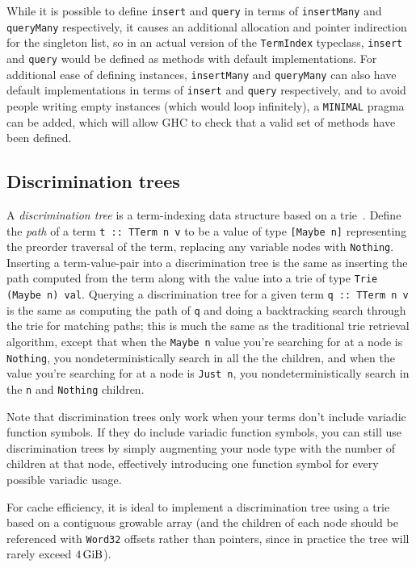 \documentclass[11pt]{report}
\newcommand{\haskell}[1]{\texttt{#1}}
\begin{document}
While it is possible to define \haskell{insert} and \haskell{query} in terms of
\haskell{insertMany} and \haskell{queryMany} respectively, it causes an
additional allocation and pointer indirection for the singleton list, so in an
actual version of the \haskell{TermIndex} typeclass, \haskell{insert} and
\haskell{query} would be defined as methods with default implementations.
For additional ease of defining instances, \haskell{insertMany} and
\haskell{queryMany} can also have default implementations in terms of
\haskell{insert} and \haskell{query} respectively, and to avoid people writing
empty instances (which would loop infinitely), a \texttt{MINIMAL} pragma can be
added, which will allow GHC to check that a valid set of methods have been
defined.

\subsection{Discrimination trees}
\label{sec:discrimination-trees}

A \textit{discrimination tree} is a term-indexing data structure based on a
trie~\cite{handbook-ch26}. Define the \textit{path} of a term
\haskell{t :: TTerm n v} to be a value of type \haskell{[Maybe n]} representing
the preorder traversal of the term, replacing any variable nodes with
\haskell{Nothing}. Inserting a term-value-pair into a discrimination tree is the
same as inserting the path computed from the term along with the value into a
trie of type \haskell{Trie (Maybe n) val}. Querying a discrimination tree for a
given term \haskell{q :: TTerm n v} is the same as computing the path of
\haskell{q} and doing a backtracking search through the trie for matching paths;
this is much the same as the traditional trie retrieval algorithm, except that
when the \haskell{Maybe n} value you're searching for at a node is
\haskell{Nothing}, you nondeterministically search in all the the children, and
when the value you're searching for at a node is \haskell{Just n}, you
nondeterministically search in the \haskell{n} and \haskell{Nothing} children.

Note that discrimination trees only work when your terms don't include variadic
function symbols. If they do include variadic function symbols, you can still
use discrimination trees by simply augmenting your node type with the number of
children at that node, effectively introducing one function symbol for every
possible variadic usage.

For cache efficiency, it is ideal to implement a discrimination tree using a
trie based on a contiguous growable array (and the children of each node should
be referenced with \haskell{Word32} offsets rather than pointers, since in
practice the tree will rarely exceed $\SI{4}{\gibi\byte}$).
\end{document}
